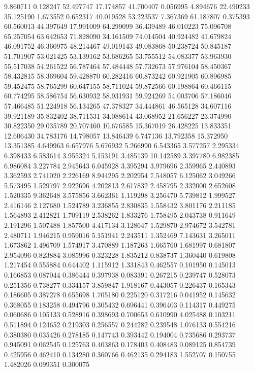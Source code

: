 9.860711
0.128247
52.497747
17.174857
41.700407
0.056995
4.894676
22.490233
35.125190
1.673552
0.652317
40.019528
53.223537
7.367369
61.187807
0.375393
60.560013
44.397649
17.991009
64.299099
36.439489
46.010223
75.096708
65.257054
63.642653
71.828090
34.161509
74.014504
40.924482
41.679824
46.091752
46.360975
48.214467
49.019143
49.083868
50.238724
50.845187
51.701907
53.021425
53.139162
53.686265
53.755512
54.083377
53.963930
55.517038
54.261522
56.787464
57.484448
57.732673
57.976104
58.450367
58.432815
58.369604
59.428870
60.282416
60.873242
60.921905
60.896985
59.452475
58.765299
60.647155
58.711024
59.872566
60.198864
60.466115
60.774295
58.586754
56.630932
58.931931
59.924269
54.003706
57.186046
57.466485
51.224918
56.134265
47.378327
34.444861
46.565128
34.607116
39.921189
35.832402
38.711531
34.088614
43.068952
21.656227
23.374990
30.822350
29.035789
20.707460
10.676585
15.367019
26.428225
13.833351
12.606430
34.783176
14.798057
13.846439
6.747136
13.792358
15.372950
13.351385
4.649963
6.657976
5.676932
5.266990
6.543365
3.577257
2.295334
6.398433
6.583614
3.955324
5.153191
3.485139
10.142589
3.397780
6.982385
6.986084
3.227784
2.945643
6.045928
3.395294
3.979696
2.359965
2.440893
3.362593
2.741020
2.226169
8.944295
2.202954
7.548057
6.125062
3.049266
5.573495
1.529797
2.922696
4.202813
2.617832
2.458795
2.332000
2.652608
1.520335
9.362648
3.575856
3.662361
1.119298
3.256470
5.739812
1.999527
2.416146
2.127680
1.524789
3.236855
2.830835
1.558432
3.801176
2.211185
1.564893
2.412821
1.709119
2.538262
1.833276
1.758495
2.043738
0.911649
2.191296
1.507488
1.857500
4.417134
3.128647
1.529870
2.974672
3.542781
2.480711
1.946215
0.959016
5.151941
2.243511
1.352469
7.143631
3.265011
1.673862
1.496709
1.574917
3.470889
1.187263
1.665760
1.681997
0.681807
2.954096
0.823884
3.085996
0.323228
1.835212
0.838737
1.360440
0.619808
1.217454
0.555884
0.644402
1.115912
1.331843
0.462557
0.101950
0.145013
0.166853
0.087044
0.386444
0.397938
0.083391
0.267215
0.239747
0.528073
0.251356
0.738277
0.334157
3.859847
1.918167
0.443057
0.226437
0.165343
0.186605
0.387278
0.655698
1.705180
0.225120
0.317216
0.041952
0.145632
0.368055
0.183258
0.494796
0.305432
0.696441
0.396403
0.114317
0.449275
0.060686
0.105133
0.528916
0.398693
0.700653
0.610990
4.025488
0.103211
0.511894
0.124652
0.219303
0.256557
0.244282
0.239548
1.076133
0.554216
0.380380
0.035426
0.278185
0.147743
0.393442
0.194004
0.735686
0.293737
0.945091
0.062545
0.125763
0.403863
0.178403
0.408483
0.089125
0.854739
0.425956
0.462410
0.134280
0.360766
0.462135
0.294183
1.552707
0.150755
1.482026
0.099351
0.300075
